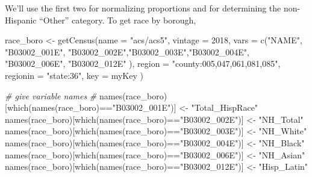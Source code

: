 \documentclass[
  openany]{book}
\newenvironment{Shaded}{\begin{snugshade}}{\end{snugshade}}
\newcommand{\AttributeTok}[1]{\textcolor[rgb]{0.77,0.63,0.00}{#1}}
\newcommand{\CommentTok}[1]{\textcolor[rgb]{0.56,0.35,0.01}{\textit{#1}}}
\newcommand{\DecValTok}[1]{\textcolor[rgb]{0.00,0.00,0.81}{#1}}
\newcommand{\FunctionTok}[1]{\textcolor[rgb]{0.00,0.00,0.00}{#1}}
\newcommand{\NormalTok}[1]{#1}
\newcommand{\OtherTok}[1]{\textcolor[rgb]{0.56,0.35,0.01}{#1}}
\newcommand{\SpecialCharTok}[1]{\textcolor[rgb]{0.00,0.00,0.00}{#1}}
\newcommand{\StringTok}[1]{\textcolor[rgb]{0.31,0.60,0.02}{#1}}
\begin{document}
We'll use the first two for normalizing proportions and for determining the non-Hispanic ``Other'' category. To get race by borough,

\begin{Shaded}
\begin{Highlighting}[]
\NormalTok{race\_boro }\OtherTok{\textless{}{-}} \FunctionTok{getCensus}\NormalTok{(}\AttributeTok{name =} \StringTok{"acs/acs5"}\NormalTok{,}
                       \AttributeTok{vintage =} \DecValTok{2018}\NormalTok{,}
                       \AttributeTok{vars =} \FunctionTok{c}\NormalTok{(}\StringTok{"NAME"}\NormalTok{, }\StringTok{"B03002\_001E"}\NormalTok{,}
                                \StringTok{"B03002\_002E"}\NormalTok{,}\StringTok{"B03002\_003E"}\NormalTok{,}\StringTok{"B03002\_004E"}\NormalTok{, }
                                \StringTok{"B03002\_006E"}\NormalTok{, }\StringTok{"B03002\_012E"}  
\NormalTok{                                 ),}
                       \AttributeTok{region =} \StringTok{"county:005,047,061,081,085"}\NormalTok{,}
                       \AttributeTok{regionin =} \StringTok{"state:36"}\NormalTok{, }
                       \AttributeTok{key =}\NormalTok{ myKey}
\NormalTok{                       )}

\CommentTok{\# give variable names}
\CommentTok{\# }
\FunctionTok{names}\NormalTok{(race\_boro)[}\FunctionTok{which}\NormalTok{(}\FunctionTok{names}\NormalTok{(race\_boro)}\SpecialCharTok{==}\StringTok{"B03002\_001E"}\NormalTok{)] }\OtherTok{\textless{}{-}} \StringTok{"Total\_HispRace"}
\FunctionTok{names}\NormalTok{(race\_boro)[}\FunctionTok{which}\NormalTok{(}\FunctionTok{names}\NormalTok{(race\_boro)}\SpecialCharTok{==}\StringTok{"B03002\_002E"}\NormalTok{)] }\OtherTok{\textless{}{-}} \StringTok{"NH\_Total"}
\FunctionTok{names}\NormalTok{(race\_boro)[}\FunctionTok{which}\NormalTok{(}\FunctionTok{names}\NormalTok{(race\_boro)}\SpecialCharTok{==}\StringTok{"B03002\_003E"}\NormalTok{)] }\OtherTok{\textless{}{-}} \StringTok{"NH\_White"}
\FunctionTok{names}\NormalTok{(race\_boro)[}\FunctionTok{which}\NormalTok{(}\FunctionTok{names}\NormalTok{(race\_boro)}\SpecialCharTok{==}\StringTok{"B03002\_004E"}\NormalTok{)] }\OtherTok{\textless{}{-}} \StringTok{"NH\_Black"}
\FunctionTok{names}\NormalTok{(race\_boro)[}\FunctionTok{which}\NormalTok{(}\FunctionTok{names}\NormalTok{(race\_boro)}\SpecialCharTok{==}\StringTok{"B03002\_006E"}\NormalTok{)] }\OtherTok{\textless{}{-}} \StringTok{"NH\_Asian"}
\FunctionTok{names}\NormalTok{(race\_boro)[}\FunctionTok{which}\NormalTok{(}\FunctionTok{names}\NormalTok{(race\_boro)}\SpecialCharTok{==}\StringTok{"B03002\_012E"}\NormalTok{)] }\OtherTok{\textless{}{-}} \StringTok{"Hisp\_Latin"}


\end{Highlighting}
\end{Shaded}
\end{document}
